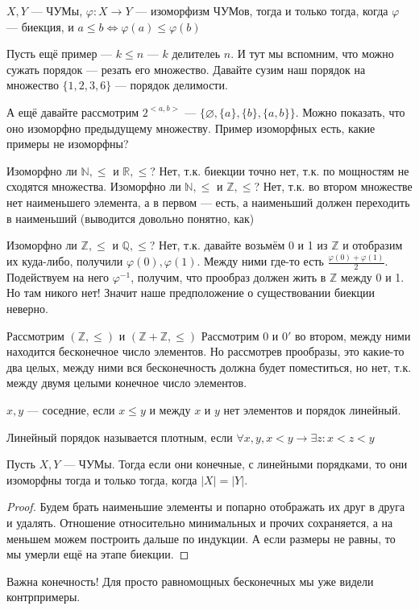 \begin{definition}
	$X, Y$ --- ЧУМы, $\varphi: X \to Y$ --- изоморфизм ЧУМов, тогда и только тогда, когда $\varphi$ --- биекция, и $a \le b \Leftrightarrow \varphi(a) \le \varphi(b)$
\end{definition}

Пусть ещё пример --- $k \le n$ --- $k$ делителеь $n$. И тут мы вспомним, что можно сужать порядок --- резать его множество. Давайте сузим наш порядок на множество $\{1, 2, 3, 6\}$ --- порядок делимости.

А ещё давайте рассмотрим $2^{<a, b>}$ --- $\{\varnothing, \{a\}, \{b\}, \{a, b\}\}$. Можно показать, что оно изоморфно предыдущему множеству. Пример изоморфных есть, какие примеры не изоморфны?

Изоморфно ли $\mathbb{N}, \le$ и $\mathbb{R}, \le$? Нет, т.к. биекции точно нет, т.к. по мощностям не сходятся множества.
Изоморфно ли $\mathbb{N}, \le$ и $\mathbb{Z}, \le$? Нет, т.к. во втором множестве нет наименьшего элемента, а в первом --- есть, а наименьший должен переходить в наименьший (выводится довольно понятно, как) 

Изоморфно ли $\mathbb{Z}, \le$ и $\mathbb{Q}, \le$? Нет, т.к. давайте возьмём 0 и 1 из $\mathbb{Z}$ и отобразим их куда-либо, получили $\varphi(0), \varphi(1)$. Между ними где-то есть $\frac{\varphi(0) + \varphi(1)}{2}$. Подействуем на него $\varphi^{-1}$, получим, что прообраз должен жить в $\mathbb{Z}$ между 0 и 1. Но там никого нет! Значит наше предположение о существовании биекции неверно.

Рассмотрим $(\mathbb{Z}, \le)$ и $(\mathbb{Z} + \mathbb{Z}, \le)$ Рассмотрим 0 и $0'$ во втором, между ними находится бесконечное число элементов. Но рассмотрев прообразы, это какие-то два целых, между ними вся бесконечность должна будет поместиться, но нет, т.к. между двумя целыми конечное число элементов.

\begin{definition}
$x, y$ --- соседние, если $x \le y$ и между $x$ и $y$ нет элементов и порядок линейный.
\end{definition}
\begin{definition}
Линейный порядок называется плотным, если $\forall x, y, x < y \to \exists z : x < z < y$
\end{definition}

\begin{theorem}
Пусть $X, Y$ --- ЧУМы. Тогда если они конечные, с линейными порядками, то они изоморфны тогда и только тогда, когда $|X| = |Y|$. 
\end{theorem}
\begin{proof}
Будем брать наименьшие элементы и попарно отображать их друг в друга и удалять. Отношение относительно минимальных и прочих сохраняется, а на меньшем можем построить дальше по индукции. А если размеры не равны, то мы умерли ещё на этапе биекции.
\end{proof}
\begin{remark}
	Важна конечность! Для просто равномощных бесконечных мы уже видели контрпримеры. 
\end{remark}

